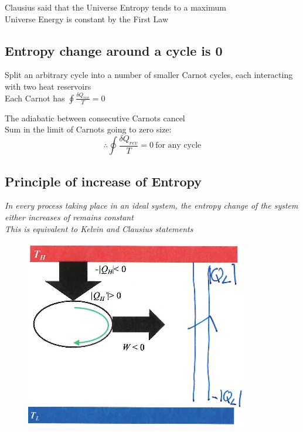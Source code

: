 \documentclass[a4paper, 11pt, normalem]{report}
\begin{document}
Clausius said that the Universe Entropy tends to a maximum \\
Universe Energy is constant by the First Law

\subsection{Entropy change around a cycle is 0}
Split an arbitrary cycle into a number of smaller Carnot cycles, each interacting with two heat reservoirs \\
Each Carnot has $\oint \frac{\delta Q_{rev}}{T} = 0$

The adiabatic between consecutive Carnots cancel \\
Sum in the limit of Carnots going to zero size:
\begin{equation*}
    \therefore \oint \frac{\delta Q_{rev}}{T} = 0 ~ \text{for any cycle}
\end{equation*}

\subsection{Principle of increase of Entropy}
\emph{In every process taking place in an ideal system, the entropy change of the system either increases of remains constant \\
This is equivalent to Kelvin and Clausius statements}

\begin{figure}
    \begin{center}
        \includegraphics[scale=0.5]{EquivEntropy.png}
    \end{center}
\end{figure}
\end{document}
